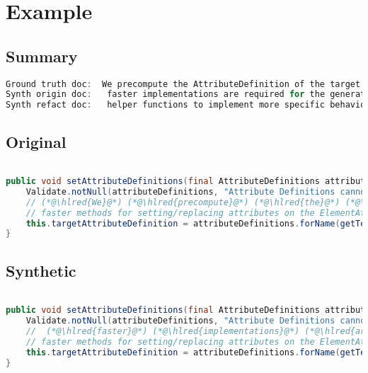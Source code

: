 \documentclass[11pt]{article}
\DeclareRobustCommand{\hlred}[1]{{\sethlcolor{YellowOrange}\hl{#1}}}
\begin{document}
  \pagebreak
  \section{Example}
  \subsection{Summary}

  \begin{lstlisting}[language=java]
Ground truth doc:  We precompute the AttributeDefinition of the target attribute in order to being able to use much
Synth origin doc:   faster implementations are required for the generation but cannot override or replace attributes instead of just
Synth refact doc:   helper functions to implement more specific behavior and other general purpose behavior to call in this
  \end{lstlisting}

  \subsection{Original}
  \begin{lstlisting}[language=java]

public void setAttributeDefinitions(final AttributeDefinitions attributeDefinitions) {
    Validate.notNull(attributeDefinitions, "Attribute Definitions cannot be null");
    // (*@\hlred{We}@*) (*@\hlred{precompute}@*) (*@\hlred{the}@*) (*@\hlred{AttributeDefinition}@*) (*@\hlred{of}@*) the (*@\hlred{target}@*) (*@\hlred{attribute}@*) (*@\hlred{in}@*) (*@\hlred{order}@*) (*@\hlred{to}@*) (*@\hlred{being}@*) (*@\hlred{able}@*) (*@\hlred{to}@*) (*@\hlred{use}@*) (*@\hlred{much}@*)
    // faster methods for setting/replacing attributes on the ElementAttributes implementation
    this.targetAttributeDefinition = attributeDefinitions.forName(getTemplateMode(), this.targetAttrCompleteName);
}
  \end{lstlisting}
  \subsection{Synthetic}

  \begin{lstlisting}[language=java]

public void setAttributeDefinitions(final AttributeDefinitions attributeDefinitions) {
    Validate.notNull(attributeDefinitions, "Attribute Definitions cannot be null");
    //  (*@\hlred{faster}@*) (*@\hlred{implementations}@*) (*@\hlred{are}@*) (*@\hlred{required}@*) (*@\hlred{for}@*) the (*@\hlred{generation}@*) (*@\hlred{but}@*) (*@\hlred{cannot}@*) (*@\hlred{override}@*) (*@\hlred{or}@*) (*@\hlred{replace}@*) (*@\hlred{attributes}@*) (*@\hlred{instead}@*) (*@\hlred{of}@*) (*@\hlred{just}@*)
    // faster methods for setting/replacing attributes on the ElementAttributes implementation
    this.targetAttributeDefinition = attributeDefinitions.forName(getTemplateMode(), this.targetAttrCompleteName);
}
  \end{lstlisting}
\end{document}
